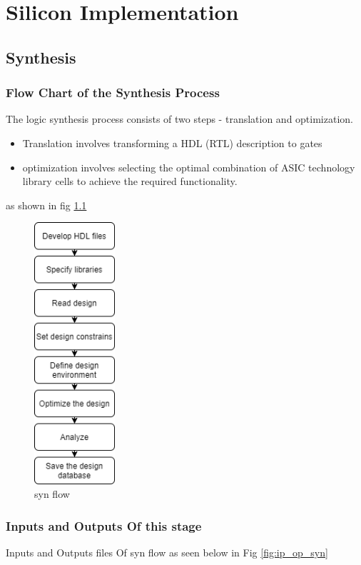 \documentclass[../main.tex]{subfiles}
\begin{document}
\chapter{Silicon Implementation}


\section{Synthesis}
    \subsection{Flow Chart of the Synthesis Process}
The logic synthesis process consists of two steps - translation and 
optimization. 
\begin{itemize}
\item Translation involves transforming a HDL (RTL) description to gates
\item optimization involves selecting the optimal combination of ASIC technology library cells to achieve the required functionality.
\end{itemize}

as shown in fig \ref{fig:syn_flow}
\begin{figure}[h]
\centering
\includegraphics[width=3cm]{diagrams/syn_flow.png}
\caption{syn flow}
\label{fig:syn_flow}
\end{figure}


  
    
\subsection{Inputs and Outputs Of this stage}
Inputs and Outputs files Of syn flow as seen below in Fig \ref{fig:ip_op_syn}
\end{document}
